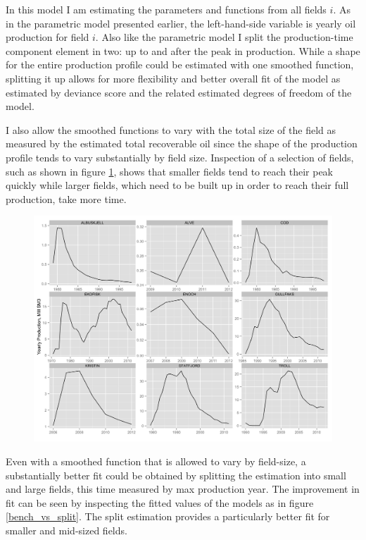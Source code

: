 \documentclass[12pt]{scrartcl} %
\begin{document}
In this model I am estimating the parameters and functions from all fields $i$. As in the parametric model presented earlier, the left-hand-side variable is yearly oil production for field $i$. Also like the parametric model I split the production-time component element in two: up to and after the peak in production.  While a shape for the entire production profile could be estimated with one smoothed function, splitting it up allows for more flexibility and better overall fit of the model as estimated by deviance score and the related estimated degrees of freedom of the model.  

I also allow the smoothed functions to vary with the total size of the field as measured by the estimated total recoverable oil since the shape of the production profile tends to vary substantially by field size.  Inspection of a selection of fields, such as shown in figure \ref{field_inspection}, shows that smaller fields tend to reach their peak quickly while larger fields, which need to be built up in order to reach their full production, take more time.

\begin{figure}
	\includegraphics[width=.8\textwidth]{field_inspection.png}
	\caption{}
	\label{field_inspection}
\end{figure}

Even with a smoothed function that is allowed to vary by field-size, a substantially better fit could be obtained by splitting the estimation into small and large fields, this time measured by max production year.  The improvement in fit can be seen by inspecting the fitted values of the models as in figure \ref{bench_vs_split}. The split estimation provides a particularly better fit for smaller and mid-sized fields.
\end{document}
